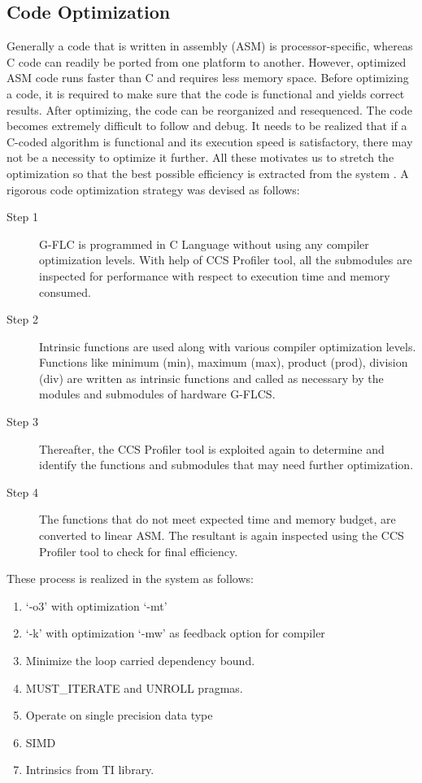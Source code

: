 \subsection{Code Optimization} \label{sec:subsec1}
Generally a code that is written in assembly (ASM) is processor\hyp{}specific, whereas C code can readily be ported from one platform to another. However, optimized ASM code runs faster than C and requires less memory space. Before optimizing a code, it is required to make sure that the code is functional and yields correct results. After optimizing, the code can be reorganized and resequenced. The code becomes extremely difficult to follow and debug. It needs to be realized that if a C\hyp{}coded algorithm is functional and its execution speed is satisfactory, there may not be a necessity to optimize it further. All these motivates us to stretch the optimization so that the best possible efficiency is extracted from the system \cite{TexasInstruments2014,Batten2000}.
A rigorous code optimization strategy was devised as follows\cite{bookchassaing2005}:
\begin{description}
	\item[Step 1] G\hyp{}FLC is programmed in C Language without using any compiler optimization levels. With help of CCS Profiler tool, all the submodules are inspected for performance with respect to execution time and memory consumed.
	\item[Step 2] Intrinsic functions are used along with various compiler optimization levels. Functions like minimum (min), maximum (max), product (prod), division (div) are written as intrinsic functions and called as necessary by the modules and submodules of hardware G\hyp{}FLCS.
	\item[Step 3] Thereafter, the CCS Profiler tool is exploited again to determine and identify the functions and submodules that may need further optimization. 
	\item[Step 4] The functions that do not meet expected time and memory budget, are converted to linear ASM. The resultant is again inspected using the CCS Profiler tool to check for final efficiency.
\end{description}

 These process is realized in the system as follows: 
 \begin{enumerate}
 	\item `-o3' with optimization `-mt' 
 	\item `-k' with optimization `-mw' as feedback option for compiler
 	\item Minimize the loop carried dependency bound. 
 	\item MUST\_ITERATE and UNROLL pragmas.
 	\item Operate on single precision data type
 	\item SIMD
 	\item Intrinsics from TI library.
 \end{enumerate}

